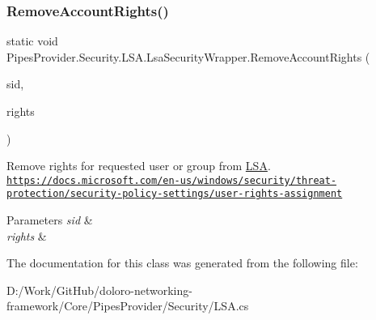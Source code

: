 \subsubsection{\texorpdfstring{Remove\+Account\+Rights()}{RemoveAccountRights()}}
{\footnotesize\ttfamily static void Pipes\+Provider.\+Security.\+L\+S\+A.\+Lsa\+Security\+Wrapper.\+Remove\+Account\+Rights (\begin{DoxyParamCaption}\item[{Security\+Identifier}]{sid,  }\item[{string}]{rights }\end{DoxyParamCaption})\hspace{0.3cm}{\ttfamily [static]}}



Remove rights for requested user or group from \mbox{\hyperlink{namespace_pipes_provider_1_1_security_1_1_l_s_a}{L\+SA}}. \href{https://docs.microsoft.com/en-us/windows/security/threat-protection/security-policy-settings/user-rights-assignment}{\tt https\+://docs.\+microsoft.\+com/en-\/us/windows/security/threat-\/protection/security-\/policy-\/settings/user-\/rights-\/assignment} 


\begin{DoxyParams}{Parameters}
{\em sid} & \\
\hline
{\em rights} & \\
\hline
\end{DoxyParams}


The documentation for this class was generated from the following file\+:\begin{DoxyCompactItemize}
\item 
D\+:/\+Work/\+Git\+Hub/doloro-\/networking-\/framework/\+Core/\+Pipes\+Provider/\+Security/L\+S\+A.\+cs\end{DoxyCompactItemize}
